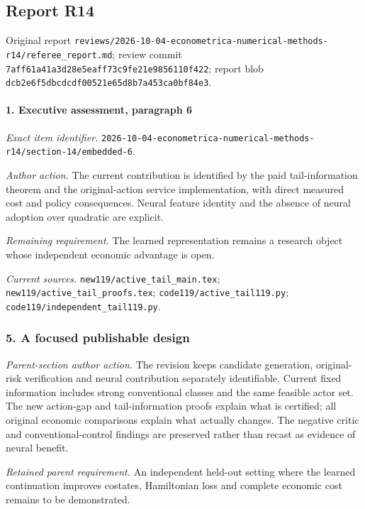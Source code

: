 \subsection{Report R14}

Original report \nolinkurl{reviews/2026-10-04-econometrica-numerical-methods-r14/referee_report.md}; review commit \nolinkurl{7aff61a41a3d28e5eaff73c9fe21e9856110f422}; report blob \nolinkurl{dcb2e6f5dbcdcdf00521e65d8b7a453ca0bf84e3}.

\paragraph{1. Executive assessment, paragraph 6}

\emph{Exact item identifier.} \nolinkurl{2026-10-04-econometrica-numerical-methods-r14/section-14/embedded-6}.

\par\emph{Author action.} The current contribution is identified by the paid tail-information theorem and the original-action service implementation, with direct measured cost and policy consequences. Neural feature identity and the absence of neural adoption over quadratic are explicit.

\par\emph{Remaining requirement.} The learned representation remains a research object whose independent economic advantage is open.

\par\emph{Current sources.} \nolinkurl{new119/active_tail_main.tex}; \nolinkurl{new119/active_tail_proofs.tex}; \nolinkurl{code119/active_tail119.py}; \nolinkurl{code119/independent_tail119.py}.

\subsubsection{5. A focused publishable design}

\emph{Parent-section author action.} The revision keeps candidate generation, original-risk verification and neural contribution separately identifiable. Current fixed information includes strong conventional classes and the same feasible actor set. The new action-gap and tail-information proofs explain what is certified; all original economic comparisons explain what actually changes. The negative critic and conventional-control findings are preserved rather than recast as evidence of neural benefit.

\par\emph{Retained parent requirement.} An independent held-out setting where the learned continuation improves costates, Hamiltonian loss and complete economic cost remains to be demonstrated.

